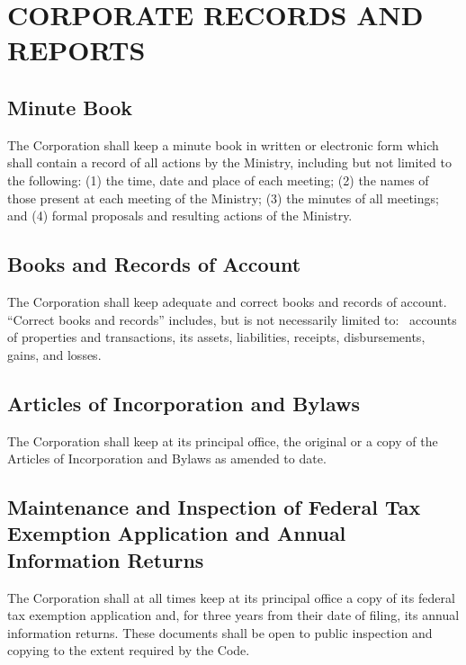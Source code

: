 \documentclass[letterpaper,titlepage]{article}
\begin{document}
\section{CORPORATE RECORDS AND REPORTS}
\label{sec:coporateRecords}
\subsection{Minute Book}
\label{sec:minuteBook}
The Corporation shall keep a minute book in written or electronic form which
shall contain a record of all actions by the Ministry, including but not
limited to the following: (1) the time, date and place of each meeting; (2) the
names of those present at each meeting of the Ministry; (3) the minutes of all
meetings; and (4) formal proposals and resulting actions of the Ministry. 
\subsection{Books and Records of Account}
\label{sec:booksRecords}
The Corporation shall keep adequate and correct books and records of account.
``Correct books and records'' includes, but is not necessarily limited to: 
accounts of properties and transactions, its assets, liabilities, receipts,
disbursements, gains, and losses.
\subsection{Articles of Incorporation and Bylaws}
\label{sec:articlesBylaws}
The Corporation shall keep at its principal office, the original or a copy of
the Articles of Incorporation and Bylaws as amended to date.
\subsection{Maintenance and Inspection of Federal Tax Exemption Application and
Annual Information Returns}
\label{sec:maintenanceInspection}
The Corporation shall at all times keep at its principal office a copy of its
federal tax exemption application and, for three years from their date of
filing, its annual information returns. These documents shall be open to public
inspection and copying to the extent required by the Code.
\end{document}
